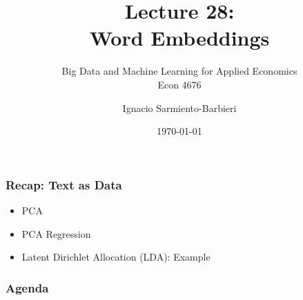 \documentclass[
  shownotes,
  xcolor={svgnames},
  hyperref={colorlinks,citecolor=DarkBlue,linkcolor=DarkRed,urlcolor=DarkBlue}
  , aspectratio=169]{beamer}
\begin{document}
\title[Lecture 28]{Lecture 28: \\ Word  Embeddings}
\subtitle{Big Data and Machine Learning for Applied Economics \\ Econ 4676}
\date{\today}

\author[Sarmiento-Barbieri]{Ignacio Sarmiento-Barbieri}


\begin{frame}[noframenumbering]
\maketitle
\end{frame}






\begin{frame}
\frametitle{Recap: Text as Data}

\begin{itemize} 
  

\item PCA 
\bigskip
\item PCA Regression 
\bigskip
\item Latent Dirichlet Allocation (LDA): Example

\end{itemize}
  
\end{frame}


\begin{frame}
\frametitle{Agenda}

\tableofcontents

\end{frame}

\end{document}
